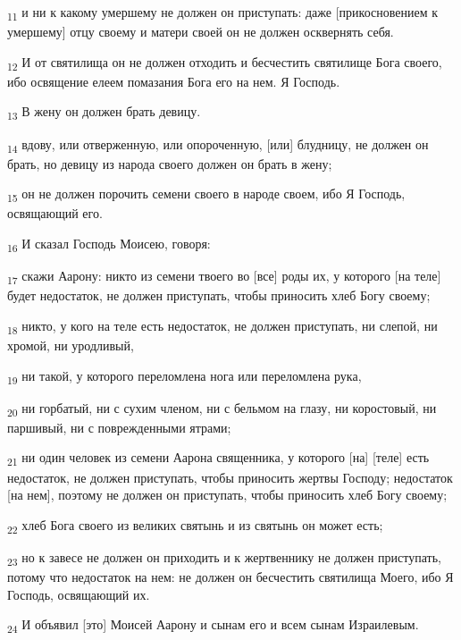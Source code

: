 \begin{tcolorbox}
\textsubscript{11} и ни к какому умершему не должен он приступать: даже [прикосновением к умершему] отцу своему и матери своей он не должен осквернять себя.
\end{tcolorbox}
\begin{tcolorbox}
\textsubscript{12} И от святилища он не должен отходить и бесчестить святилище Бога своего, ибо освящение елеем помазания Бога его на нем. Я Господь.
\end{tcolorbox}
\begin{tcolorbox}
\textsubscript{13} В жену он должен брать девицу.
\end{tcolorbox}
\begin{tcolorbox}
\textsubscript{14} вдову, или отверженную, или опороченную, [или] блудницу, не должен он брать, но девицу из народа своего должен он брать в жену;
\end{tcolorbox}
\begin{tcolorbox}
\textsubscript{15} он не должен порочить семени своего в народе своем, ибо Я Господь, освящающий его.
\end{tcolorbox}
\begin{tcolorbox}
\textsubscript{16} И сказал Господь Моисею, говоря:
\end{tcolorbox}
\begin{tcolorbox}
\textsubscript{17} скажи Аарону: никто из семени твоего во [все] роды их, у которого [на теле] будет недостаток, не должен приступать, чтобы приносить хлеб Богу своему;
\end{tcolorbox}
\begin{tcolorbox}
\textsubscript{18} никто, у кого на теле есть недостаток, не должен приступать, ни слепой, ни хромой, ни уродливый,
\end{tcolorbox}
\begin{tcolorbox}
\textsubscript{19} ни такой, у которого переломлена нога или переломлена рука,
\end{tcolorbox}
\begin{tcolorbox}
\textsubscript{20} ни горбатый, ни с сухим членом, ни с бельмом на глазу, ни коростовый, ни паршивый, ни с поврежденными ятрами;
\end{tcolorbox}
\begin{tcolorbox}
\textsubscript{21} ни один человек из семени Аарона священника, у которого [на] [теле] есть недостаток, не должен приступать, чтобы приносить жертвы Господу; недостаток [на нем], поэтому не должен он приступать, чтобы приносить хлеб Богу своему;
\end{tcolorbox}
\begin{tcolorbox}
\textsubscript{22} хлеб Бога своего из великих святынь и из святынь он может есть;
\end{tcolorbox}
\begin{tcolorbox}
\textsubscript{23} но к завесе не должен он приходить и к жертвеннику не должен приступать, потому что недостаток на нем: не должен он бесчестить святилища Моего, ибо Я Господь, освящающий их.
\end{tcolorbox}
\begin{tcolorbox}
\textsubscript{24} И объявил [это] Моисей Аарону и сынам его и всем сынам Израилевым.
\end{tcolorbox}
